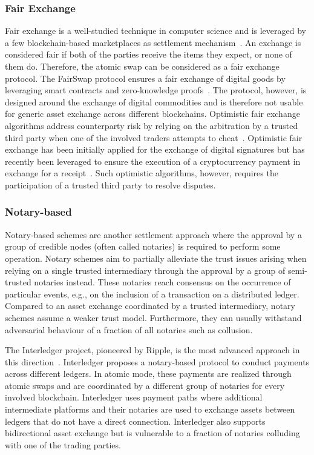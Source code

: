 \subsubsection{Fair Exchange}
Fair exchange is a well-studied technique in computer science and is leveraged by a few blockchain-based marketplaces as settlement mechanism~\cite{pagnia2003fair}.
An exchange is considered fair if both of the parties receive the items they expect, or none of them do.
Therefore, the atomic swap can be considered as a fair exchange protocol.
The FairSwap protocol ensures a fair exchange of digital goods by leveraging smart contracts and zero-knowledge proofs~\cite{dziembowski2018fairswap}.
The protocol, however, is designed around the exchange of digital commodities and is therefore not usable for generic asset exchange across different blockchains.
Optimistic fair exchange algorithms address counterparty risk by relying on the arbitration by a trusted third party when one of the involved traders attempts to cheat~\cite{asokan1997optimistic}.
Optimistic fair exchange has been initially applied for the exchange of digital signatures but has recently been leveraged to ensure the execution of a cryptocurrency payment in exchange for a receipt~\cite{liu2018toward}.
Such optimistic algorithms, however, requires the participation of a trusted third party to resolve disputes.

\subsubsection{Notary-based}
Notary-based schemes are another settlement approach where the approval by a group of credible nodes (often called notaries) is required to perform some operation.
Notary schemes aim to partially alleviate the trust issues arising when relying on a single trusted intermediary through the approval by a group of semi-trusted notaries instead.
These notaries reach consensus on the occurrence of particular events, e.g., on the inclusion of a transaction on a distributed ledger.
Compared to an asset exchange coordinated by a trusted intermediary, notary schemes assume a weaker trust model. Furthermore, they can usually withstand adversarial behaviour of a fraction of all notaries such as collusion.

The Interledger project, pioneered by Ripple, is the most advanced approach in this direction~\cite{thomas2015protocol}.
Interledger proposes a notary-based protocol to conduct payments across different ledgers.
In atomic mode, these payments are realized through atomic swaps and are coordinated by a different group of notaries for every involved blockchain.
Interledger uses payment paths where additional intermediate platforms and their notaries are used to exchange assets between ledgers that do not have a direct connection.
Interledger also supports bidirectional asset exchange but is vulnerable to a fraction of notaries colluding with one of the trading parties.

